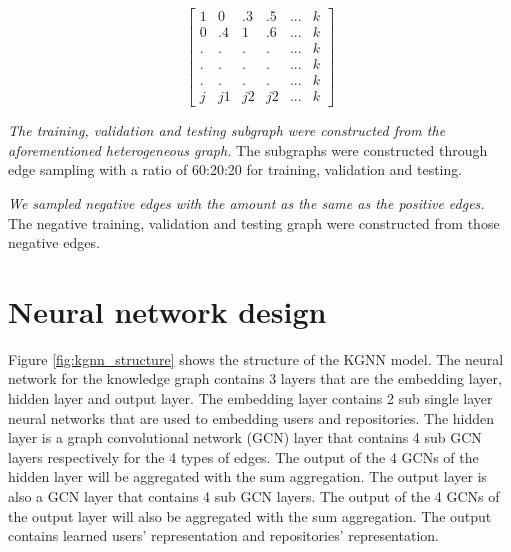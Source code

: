 \documentclass[11pt,twoside]{report}
\begin{document}
\begin{equation}
    \begin{bmatrix}
        1 & 0 & .3 & .5 & ... & k \\
        0 & .4 & 1 & .6 & ... & k \\
        . & . & . & . & ... & k \\
        . & . & . & . & ... & k \\
        . & . & . & . & ... & k \\
        j & j1 & j2 & j2 & ... & k
        \label{matrix:repo_feature}
    \end{bmatrix}
\end{equation}

\textit{The training, validation and testing subgraph were constructed from the aforementioned heterogeneous graph.} The subgraphs were constructed through edge sampling with a ratio of 60:20:20 for training, validation and testing.

\textit{We sampled negative edges with the amount as the same as the positive edges.} The negative training, validation and testing graph were constructed from those negative edges.

\section{Neural network design}
Figure \ref{fig:kgnn_structure} shows the structure of the KGNN model. The neural network for the knowledge graph contains 3 layers that are the embedding layer, hidden layer and output layer. The embedding layer contains 2 sub single layer neural networks that are used to embedding users and repositories. The hidden layer is a graph convolutional network (GCN) \cite{kipf_semi-supervised_2017} layer that contains 4 sub GCN layers respectively for the 4 types of edges. The output of the 4 GCNs of the hidden layer will be aggregated with the sum aggregation. The output layer is also a GCN layer that contains 4 sub GCN layers. The output of the 4 GCNs of the output layer will also be aggregated with the sum aggregation. The output contains learned users' representation and repositories' representation.
\end{document}
